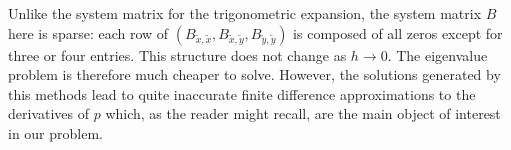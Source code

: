 Unlike the system matrix for the trigonometric expansion, the system
matrix $B$ here is sparse: each row of
$(B_{\tilde{x},\tilde{x}}, B_{\tilde{x},\tilde{y}},
B_{\tilde{y},\tilde{y}})$ is composed of all zeros except for three or
four entries. This structure does not change as $h \to 0$. The
eigenvalue problem is therefore much cheaper to solve. However, the
solutions generated by this methods lead to quite inaccurate finite
difference approximations to the derivatives of $p$ which, as the
reader might recall, are the main object of interest in our problem.





